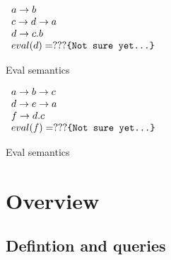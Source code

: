 \documentclass[11pt]{article}
\begin{document}
\begin{example}[H]
$
  \begin{array}{l}
    a \rightarrow b \\
    c \rightarrow d \rightarrow a \\ 
    d \rightarrow c.b \\
    eval(d) = ??? \texttt{\{Not sure yet\textellipsis\}}
  \end{array}
$
\caption{Eval semantics}
\end{example}

\begin{example}[H]
$
  \begin{array}{l}
    a \rightarrow b \rightarrow c \\
    d \rightarrow e \rightarrow a \\ 
    f \rightarrow d.c \\
    eval(f) = ??? \texttt{\{Not sure yet\textellipsis\}}
  \end{array}
$
\caption{Eval semantics}
\end{example}

\section{Overview}

\begin{comment}
In the initial sections of this paper we will ignore certain existing. In the final sections a comparison with the existing theories is provided.

\subsection{Concepts}

\begin{itemize}
\item Curry-Howard correspondence: Once one starts investigating, similar correspondences can be found in a very wide range of programming concepts.
\end{itemize}

\end{comment}

\subsection{Defintion and queries}
\end{document}
